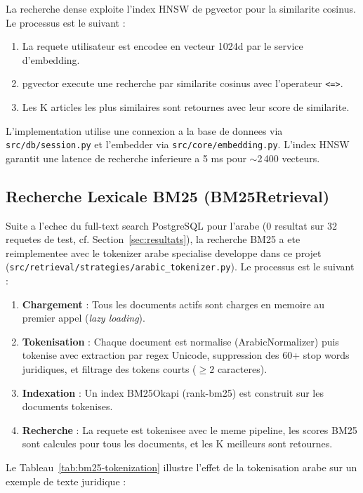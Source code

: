 La recherche dense exploite l'index HNSW de pgvector pour la similarite cosinus. Le processus est le suivant :

\begin{enumerate}
    \item La requete utilisateur est encodee en vecteur 1024d par le service d'embedding.
    \item pgvector execute une recherche par similarite cosinus avec l'operateur \texttt{<=>}.
    \item Les K articles les plus similaires sont retournes avec leur score de similarite.
\end{enumerate}

L'implementation utilise une connexion a la base de donnees via \texttt{src/db/session.py} et l'embedder via \texttt{src/core/embedding.py}. L'index HNSW garantit une latence de recherche inferieure a 5 ms pour $\sim$2\,400 vecteurs.

\subsection{Recherche Lexicale BM25 (BM25Retrieval)}

Suite a l'echec du full-text search PostgreSQL pour l'arabe (0 resultat sur 32 requetes de test, cf. Section~\ref{sec:resultats}), la recherche BM25 a ete reimplementee avec le tokenizer arabe specialise developpe dans ce projet (\texttt{src/retrieval/strategies/arabic\_tokenizer.py}). Le processus est le suivant :

\begin{enumerate}
    \item \textbf{Chargement} : Tous les documents actifs sont charges en memoire au premier appel (\textit{lazy loading}).
    \item \textbf{Tokenisation} : Chaque document est normalise (ArabicNormalizer) puis tokenise avec extraction par regex Unicode, suppression des 60+ stop words juridiques, et filtrage des tokens courts ($\ge 2$ caracteres).
    \item \textbf{Indexation} : Un index BM25Okapi (rank-bm25) est construit sur les documents tokenises.
    \item \textbf{Recherche} : La requete est tokenisee avec le meme pipeline, les scores BM25 sont calcules pour tous les documents, et les K meilleurs sont retournes.
\end{enumerate}

Le Tableau~\ref{tab:bm25-tokenization} illustre l'effet de la tokenisation arabe sur un exemple de texte juridique :

